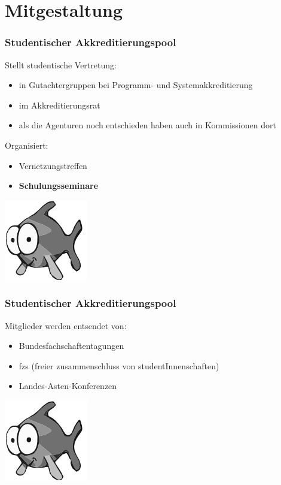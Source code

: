 \documentclass{beamer}
\begin{document}
\section{Mitgestaltung}
\frame{\tableofcontents[currentsection]}
\begin{frame}
\frametitle{Studentischer Akkreditierungspool}
Stellt studentische Vertretung:
\begin{itemize}
\item in Gutachtergruppen bei Programm- und Systemakkreditierung
\item im Akkreditierungsrat
\item als die Agenturen noch entschieden haben auch in Kommissionen dort
\end{itemize}
Organisiert:
\begin{itemize}
\item Vernetzungstreffen
\item \textbf{Schulungsseminare}
\end{itemize}
\hspace*{7cm}\includegraphics[scale=0.6]{pool.PNG}
\end{frame}
\begin{frame}
\frametitle{Studentischer Akkreditierungspool}
Mitglieder werden entsendet von:
\begin{itemize}
\item Bundesfachschaftentagungen
\item fzs (freier zusammenschluss von studentInnenschaften)
\item Landes-Asten-Konferenzen
\end{itemize}
\hspace*{7cm}\includegraphics[scale=0.6]{pool.PNG}
\end{frame}
\end{document}
